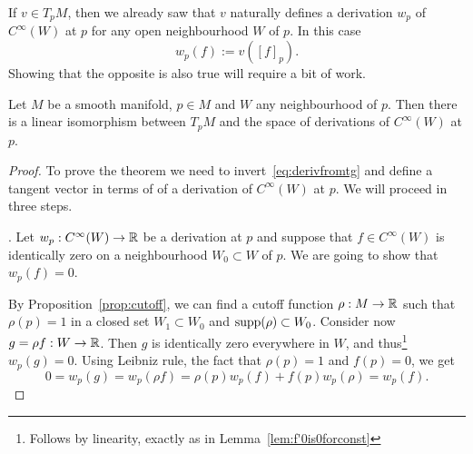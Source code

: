 If $v\in T_p M$, then we already saw that $v$ naturally defines a derivation $w_p$ of $C^\infty(W)$ at $p$ for any open neighbourhood $W$ of $p$.
In this case
\begin{equation}\label{eq:derivfromtg}
	w_p(f) := v([f]_p).
\end{equation}
Showing that the opposite is also true will require a bit of work.

\begin{proposition}
	Let $M$ be a smooth manifold, $p\in M$ and $W$ any neighbourhood of $p$.
	Then there is a linear isomorphism between $T_p M$ and the space of derivations of $C^\infty(W)$ at $p$.
\end{proposition}
\begin{proof}
	To prove the theorem we need to invert~\eqref{eq:derivfromtg} and define a tangent vector in terms of of a derivation of $C^\infty(W)$ at $p$.
	We will proceed in three steps.

	. Let $w_p:C^\infty(W) \to\mathbb{R}$ be a derivation at $p$ and suppose that $f\in C^\infty(W)$ is identically zero on a neighbourhood $W_0\subset W$ of $p$.
	We are going to show that $w_p(f)=0$.

	By Proposition~\ref{prop:cutoff}, we can find a cutoff function $\rho:M\to\mathbb{R}$ such that $\rho(p)=1$ in a closed set $W_1 \subset W_0$ and $\operatorname{supp}(\rho) \subset W_0$. Consider now $g = \rho f : W \to \mathbb{R}$.
	Then $g$ is identically zero everywhere in $W$, and thus\footnote{Follows by linearity, exactly as in Lemma~\ref{lem:f'0is0forconst}} $w_p(g) = 0$.
	Using Leibniz rule, the fact that $\rho(p)=1$ and $f(p) = 0$, we get
	\begin{equation}
		0 = w_p(g) = w_p(\rho f) = \rho(p) w_p(f) + f(p)w_p(\rho) = w_p(f).
	\end{equation}


\end{proof}
